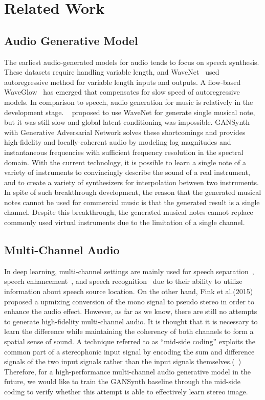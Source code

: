 \section{Related Work}
\label{sec:related_work}
\subsection{Audio Generative Model}

The earliest audio-generated models for audio tends to focus on speech synthesis. These datasets require handling variable length, and WaveNet~\cite{wavenet} used autoregressive method for variable length inputs and outputs. A flow-based WaveGlow~\cite{waveglow} has emerged that compensates for slow speed of autoregressive models. In comparison to speech, audio generation for music is relatively in the development stage. ~\cite{nsynth} proposed to use WaveNet for generate single musical note, but it was still slow and global latent conditioning was impossible. GANSynth~\cite{gansynth} with Generative Adversarial Network solves these shortcomings and provides high-fidelity and locally-coherent audio by modeling log magnitudes and instantaneous frequencies with sufficient frequency resolution in the spectral domain. With the current technology, it is possible to learn a single note of a variety of instruments to convincingly describe the sound of a real instrument, and to create a variety of synthesizers for interpolation between two instruments. In spite of such breakthrough development, the reason that the generated musical notes cannot be used for commercial music is that the generated result is a single channel. Despite this breakthrough, the generated musical notes cannot replace commonly used virtual instruments due to the limitation of a single channel.


\subsection{Multi-Channel Audio}

In deep learning, multi-channel settings are mainly used for speech separation~\cite{multi_ch_sourcesep}, speech enhancement~\cite{speech_enh}, and speech recognition~\cite{speech_recog} due to their ability to utilize information about speech source location. On the other hand, 
Fink et al.(2015) 
\fi
~\cite{upmix} proposed a upmixing conversion of the mono signal to pseudo stereo in order to enhance the audio effect. However, as far as we know, there are still no attempts to generate high-fidelity multi-channel audio. It is thought that it is necessary to learn the difference while maintaining the coherency of both channels to form a spatial sense of sound. A technique referred to as “mid-side coding” exploits the common part of a stereophonic input signal by encoding the sum and difference signals of the two input signals rather than the input signals themselves.(~\cite{mscoding}) Therefore, for a high-performance multi-channel audio generative model in the future, we would like to train the GANSynth baseline through the mid-side coding to verify whether this attempt is able to effectively learn stereo image.